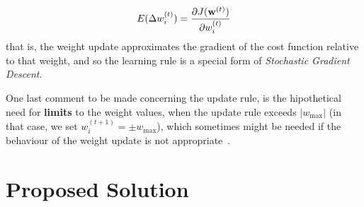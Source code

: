 \begin{equation}\label{eq:spsa_gradProof}
    E(\Delta w_i^{(t)}) = \frac{\partial J(\mathbf{w}^{(t)})}{\partial w_i^{(t)}}
\end{equation}
that is, the weight update approximates the gradient of the cost function relative to that weight, and so the learning rule is a special form of \textit{Stochastic Gradient Descent}.

One last comment to be made concerning the update rule, is the hipothetical need for \textbf{limits} to the weight values, when the update rule exceeds $|w_{\text{max}}|$ (in that case, we set $w_i^{(t+1)} = \pm w_{\text{max}}$), which sometimes might be needed if the behaviour of the weight update is not appropriate~\cite{Maeda05}.

\section{Proposed Solution}\label{sec:propSol}
